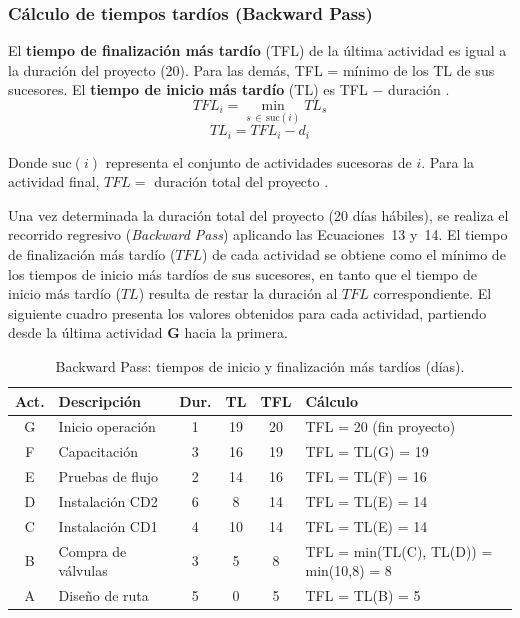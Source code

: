 \documentclass[12pt,a4paper]{article}
\begin{document}
\subsubsection{C\'{a}lculo de tiempos tard\'{i}os (Backward Pass)}

El \textbf{tiempo de finalizaci\'{o}n m\'{a}s tard\'{i}o} (TFL) de la \'{u}ltima actividad 
es igual a la duraci\'{o}n del proyecto (20). Para las dem\'{a}s, TFL = m\'{i}nimo de los 
TL de sus sucesores. El \textbf{tiempo de inicio m\'{a}s tard\'{i}o} (TL) es TFL $-$ 
duraci\'{o}n \cite{hillier2015}.\\

\begin{equation}
  TFL_i = \min_{s \,\in\, \text{suc}(i)} TL_s
\end{equation}
\begin{equation}
  TL_i = TFL_i - d_i
\end{equation}

\noindent
Donde $\text{suc}(i)$ representa el conjunto de actividades sucesoras de $i$. 
Para la actividad final, $TFL = $ duraci\'{o}n total del proyecto \cite{render2012}.

Una vez determinada la duraci\'{o}n total del proyecto (20 d\'{i}as h\'{a}biles), se 
realiza el recorrido regresivo (\textit{Backward Pass}) aplicando las Ecuaciones~13 
y~14. El tiempo de finalizaci\'{o}n m\'{a}s tard\'{i}o ($TFL$) de cada actividad se 
obtiene como el m\'{i}nimo de los tiempos de inicio m\'{a}s tard\'{i}os de sus 
sucesores, en tanto que el tiempo de inicio m\'{a}s tard\'{i}o ($TL$) resulta de 
restar la duraci\'{o}n al $TFL$ correspondiente. El siguiente cuadro presenta los 
valores obtenidos para cada actividad, partiendo desde la \'{u}ltima actividad 
\textbf{G} hacia la primera.

\begin{table}[H]
  \centering
  \begin{tabular}{|c|l|c|c|c|l|}
    \hline
    \rowcolor{azulClaro}
    \textbf{Act.} & \textbf{Descripci\'{o}n} & \textbf{Dur.} & \textbf{TL} & \textbf{TFL} & \textbf{C\'{a}lculo} \\
    \hline
    G & Inicio operaci\'{o}n   & 1 & 19 & 20 & TFL = 20 (fin proyecto) \\
    F & Capacitaci\'{o}n       & 3 & 16 & 19 & TFL = TL(G) = 19 \\
    E & Pruebas de flujo        & 2 & 14 & 16 & TFL = TL(F) = 16 \\
    D & Instalaci\'{o}n CD2    & 6 & 8  & 14 & TFL = TL(E) = 14 \\
    C & Instalaci\'{o}n CD1    & 4 & 10 & 14 & TFL = TL(E) = 14 \\
    B & Compra de v\'{a}lvulas & 3 & 5  & 8  & TFL = min(TL(C), TL(D)) = min(10,8) = 8 \\
    A & Dise\~{n}o de ruta     & 5 & 0  & 5  & TFL = TL(B) = 5 \\
    \hline
  \end{tabular}
  \caption{Backward Pass: tiempos de inicio y finalizaci\'{o}n m\'{a}s tard\'{i}os (d\'{i}as).}
\end{table}
\end{document}
